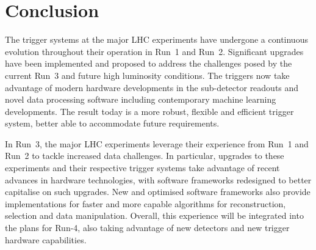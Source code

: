 \section{Conclusion}

The trigger systems at the major LHC experiments have undergone a continuous evolution throughout their operation in Run~1 and Run~2. Significant upgrades have been implemented and proposed to address the challenges posed by the current Run~3 and future high luminosity conditions. The triggers now take advantage of modern hardware developments in the sub-detector readouts and novel data processing software including contemporary machine learning developments. The result today is a more robust, flexible and efficient trigger system, better able to accommodate future requirements.

In Run~3, the major LHC experiments leverage their experience from Run~1 and Run~2 to tackle increased data challenges. In particular, upgrades to these experiments and their respective trigger systems take advantage of recent advances in hardware technologies, with software frameworks redesigned to better capitalise on such upgrades. New and optimised software frameworks also provide implementations for faster and more capable algorithms for reconstruction, selection and data manipulation. Overall, this experience will be integrated into the plans for Run-4, also taking advantage of new detectors and new trigger hardware capabilities. 
